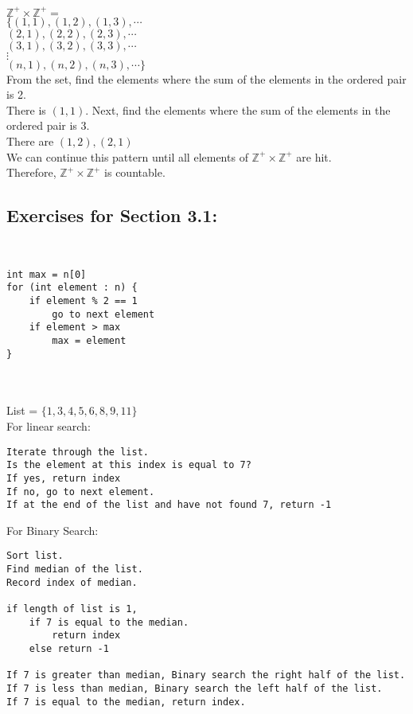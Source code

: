 \documentclass[12pt]{article}  %
\begin{document}
\\
\\
$\mathbb{Z}^+\times\mathbb{Z}^+=$\\
$\{(1,1),(1,2),(1,3),\cdots$\\
$(2,1),(2,2),(2,3),\cdots$\\
$(3,1),(3,2),(3,3),\cdots$\\
$\vdots$\\
$(n,1),(n,2),(n,3),\cdots\}$\\
From the set, find the elements where the sum of the elements in the ordered pair is 2.\\
There is $(1,1)$.
Next, find the elements where the sum of the elements in the ordered pair is 3.\\
There are $(1,2),(2,1)$\\
We can continue this pattern until all elements of $\mathbb{Z}^+\times\mathbb{Z}^+$ are hit.\\
Therefore, $\mathbb{Z}^+\times\mathbb{Z}^+$ is countable.

\clearpage
\subsection*{Exercises for Section 3.1:}     

\\
\begin{verbatim}
int max = n[0]
for (int element : n) {
    if element % 2 == 1
        go to next element
    if element > max
        max = element
}
\end{verbatim}

\\
\\
List = $\{1,3,4,5,6,8,9,11\}$\\
For linear search:
\begin{verbatim}
Iterate through the list.
Is the element at this index is equal to 7?
If yes, return index
If no, go to next element.
If at the end of the list and have not found 7, return -1
\end{verbatim}
For Binary Search:
\begin{verbatim}
Sort list.
Find median of the list.
Record index of median.

if length of list is 1,
    if 7 is equal to the median.
        return index
    else return -1

If 7 is greater than median, Binary search the right half of the list.
If 7 is less than median, Binary search the left half of the list.
If 7 is equal to the median, return index.
\end{verbatim}
\end{document}
